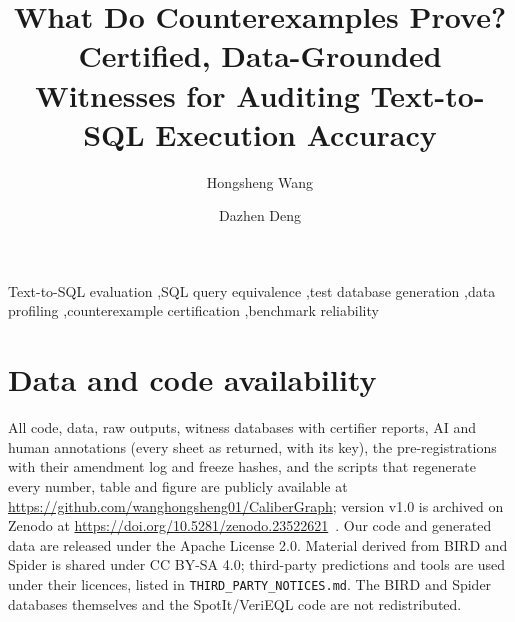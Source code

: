 \documentclass[preprint,12pt]{elsarticle}
\newcommand{\artifacturl}{\url{https://github.com/wanghongsheng01/CaliberGraph}}
\begin{document}
\begin{frontmatter}
\title{What Do Counterexamples Prove? Certified, Data-Grounded Witnesses for Auditing Text-to-SQL Execution Accuracy}

\author[1,2]{Hongsheng Wang}
\author[3]{Dazhen Deng}



\begin{keyword}
Text-to-SQL evaluation \sep SQL query equivalence \sep test database generation \sep data profiling \sep counterexample certification \sep benchmark reliability
\end{keyword}
\end{frontmatter}

\linenumbers












\section*{Data and code availability}
All code, data, raw outputs, witness databases with certifier reports, AI and human annotations (every sheet as returned, with its key), the pre-registrations with their amendment log and freeze hashes, and the scripts that regenerate every number, table and figure are publicly available at \artifacturl{}; version v1.0 is archived on Zenodo at \url{https://doi.org/10.5281/zenodo.23522621}~\cite{calibergraph_artifact}. Our code and generated data are released under the Apache License 2.0. Material derived from BIRD and Spider is shared under CC BY-SA 4.0; third-party predictions and tools are used under their licences, listed in \texttt{THIRD\_PARTY\_NOTICES.md}. The BIRD and Spider databases themselves and the SpotIt/VeriEQL code are not redistributed.
\end{document}
